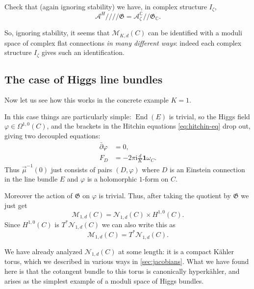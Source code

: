 \documentclass[12pt,letterpaper,reqno]{article}
\numberwithin{equation}{section}
\newcommand{\fG}{{\mathfrak G}}
\newcommand{\cM}{\ensuremath{\mathcal M}}
\newcommand{\cN}{\ensuremath{\mathcal N}}
\newcommand{\cA}{\ensuremath{\mathcal A}}
\newcommand{\C}{\ensuremath{\mathbb C}}
\newcommand{\kahler}{K\"ahler\xspace}
\newcommand{\kq}{/\!\!/}
\newcommand{\hk}{hyperk\"ahler\xspace}
\newcommand{\hkq}{/\!\!/\!\!/\!\!/}
\newcommand{\I}{{\mathrm i}}
\newcommand\bid{{\mathbf 1}}
\newcommand{\ti}[1]{\textit{#1}}
\DeclareMathOperator{\End}{End}
\begin{document}
\begin{exercise}
Check that (again ignoring stability) we have,
in complex structure $I_\zeta$,
\begin{equation}
  \cA^H \hkq \fG = \cA_\zeta^\C \kq \fG_\C.
\end{equation}
\end{exercise}

So, ignoring stability, it seems that $\cM_{K,d}(C)$ can be identified with 
a moduli space of complex flat connections 
\ti{in many different ways}: indeed each
complex structure $I_\zeta$ gives such an identification.


\subsection{The case of Higgs line bundles}

\begin{example}
Now let us see how this works in the concrete example $K=1$.

In this case things are particularly simple: $\End(E)$ is trivial,
so the Higgs field $\varphi \in \Omega^{1,0}(C)$,
and the brackets in the Hitchin equations \eqref{eq:hitchin-eq} 
drop out, giving two decoupled equations:
\begin{subequations}
\begin{align}
  \bar\partial \varphi &= 0, \\
  F_D &= - 2\pi \I \frac{d}{K} \bid \omega_C.
\end{align}
\end{subequations}
Thus $\vec\mu^{-1}(0)$ just consists of pairs $(D,\varphi)$
where $D$ is an Einstein connection in 
the line bundle $E$ and $\varphi$ is a holomorphic $1$-form on $C$.

Moreover the action of $\fG$ on $\varphi$ is trivial.
Thus, after taking the quotient by $\fG$ we just get
\begin{equation}
  \cM_{1,d}(C) = \cN_{1,d}(C) \times H^{1,0}(C).
\end{equation}
Since $H^{1,0}(C)$ is $T^* \cN_{1,d}(C)$ we can also write this as
\begin{equation}
  \cM_{1,d}(C) = T^* \cN_{1,d}(C). 
\end{equation}

We have already analyzed $\cN_{1,d}(C)$ at some length: it is a compact
\kahler torus, which we described in various ways 
in \autoref{sec:jacobians}. 
What we have found here is that the cotangent bundle
to this torus is canonically \hk, and arises as the 
simplest example of a moduli space of Higgs bundles.
\end{example}
\end{document}
